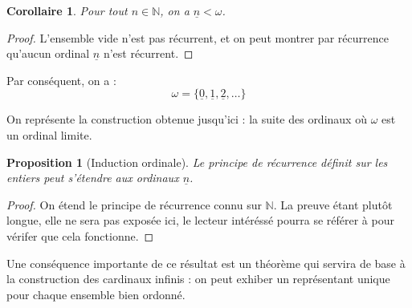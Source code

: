 \documentclass[french]{article}
\theoremstyle{definition}
\theoremstyle{plain}
\newtheorem{proposition}[subsubsection]{Proposition}
\theoremstyle{plain}
\newtheorem{corollary}[subsubsection]{Corollaire}
\theoremstyle{plain}
\theoremstyle{plain}
\theoremstyle{plain}
\begin{document}
\begin{corollary}
	Pour tout \( n \in \mathbb{N} \), on a \( \underline{n} < \omega \).
\end{corollary}

\begin{proof}
	L'ensemble vide n'est pas récurrent, et on peut montrer par récurrence qu'aucun ordinal \( \underline{n} \) n'est récurrent.
\end{proof}

\par Par conséquent, on a :
\begin{equation*}
	\omega = \{\underline{0}, \underline{1}, \underline{2}, \ldots\}
\end{equation*}

\par On représente la construction obtenue jusqu'ici : la suite des ordinaux où \( \omega \) est un ordinal limite.
\begin{center}
\end{center}

\begin{proposition}[Induction ordinale]
	Le principe de récurrence définit sur les entiers peut s'étendre aux ordinaux \( \underline{n} \).
\end{proposition}
\begin{proof}
	On étend le principe de récurrence connu sur \( \mathbb{N} \). La preuve étant plutôt longue, elle ne sera pas exposée ici, le lecteur intéréssé pourra se référer à \cite{dehornoy2017théorie} pour vérifer que cela fonctionne.
\end{proof}

\par Une conséquence importante de ce résultat est un théorème qui servira de base à la construction des cardinaux infinis : on peut exhiber un représentant unique pour chaque ensemble bien ordonné.
\end{document}
